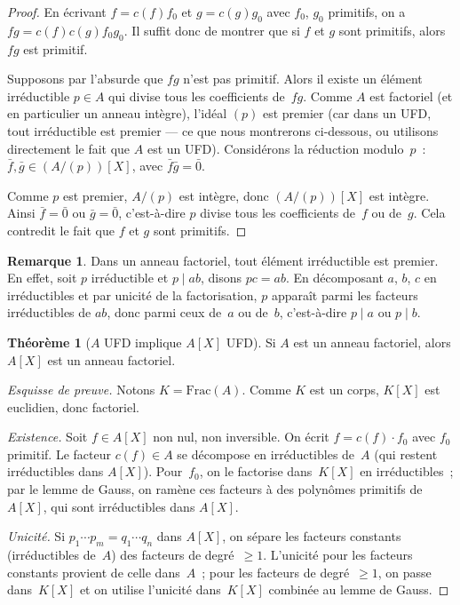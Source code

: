 \documentclass[12pt,a4paper,openany]{book}
\theoremstyle{definition}
\newtheorem{theoreme}{Théorème}[chapter]
\newtheorem{remarque}{Remarque}[chapter]
\begin{document}
\begin{proof}
En écrivant $f = c(f) f_0$ et $g = c(g) g_0$ avec $f_0$, $g_0$
primitifs, on a $fg = c(f)c(g) f_0 g_0$. Il suffit donc de montrer que
si $f$ et $g$ sont primitifs, alors $fg$ est primitif.

Supposons par l'absurde que $fg$ n'est pas primitif. Alors il existe un
élément irréductible $p \in A$ qui divise tous les coefficients de~$fg$.
Comme $A$ est factoriel (et en particulier un anneau intègre), l'idéal
$(p)$ est premier (car dans un UFD, tout irréductible est premier --- ce
que nous montrerons ci-dessous, ou utilisons directement le fait que $A$
est un UFD). Considérons la réduction modulo~$p$~:
$\bar{f}, \bar{g} \in (A/(p))[X]$, avec $\bar{f}\bar{g} = \bar{0}$.

Comme $p$ est premier, $A/(p)$ est intègre, donc $(A/(p))[X]$ est
intègre. Ainsi $\bar{f} = \bar{0}$ ou $\bar{g} = \bar{0}$,
c'est-à-dire $p$ divise tous les coefficients de~$f$ ou de~$g$. Cela
contredit le fait que $f$ et $g$ sont primitifs.
\end{proof}

\begin{remarque}\label{rem:irred-premier-UFD}
Dans un anneau factoriel, tout élément irréductible est premier. En
effet, soit $p$ irréductible et $p \mid ab$, disons $pc = ab$. En
décomposant $a$, $b$, $c$ en irréductibles et par unicité de la
factorisation, $p$ apparaît parmi les facteurs irréductibles de $ab$,
donc parmi ceux de~$a$ ou de~$b$, c'est-à-dire $p \mid a$ ou
$p \mid b$.
\end{remarque}

\begin{theoreme}[$A$ UFD implique {$A[X]$} UFD]\label{thm:AX-UFD}
Si $A$ est un anneau factoriel, alors $A[X]$ est un anneau factoriel.
\end{theoreme}

\begin{proof}[Esquisse de preuve]
Notons $K = \mathrm{Frac}(A)$. Comme $K$ est un corps, $K[X]$ est
euclidien, donc factoriel.

\emph{Existence.} Soit $f \in A[X]$ non nul, non inversible. On écrit
$f = c(f) \cdot f_0$ avec $f_0$ primitif. Le facteur $c(f) \in A$ se
décompose en irréductibles de~$A$ (qui restent irréductibles dans
$A[X]$). Pour~$f_0$, on le factorise dans~$K[X]$ en irréductibles~;
par le lemme de Gauss, on ramène ces facteurs à des polynômes primitifs
de~$A[X]$, qui sont irréductibles dans $A[X]$.

\emph{Unicité.} Si $p_1 \cdots p_m = q_1 \cdots q_n$ dans $A[X]$, on
sépare les facteurs constants (irréductibles de~$A$) des facteurs de
degré~$\geqslant 1$. L'unicité pour les facteurs constants provient de
celle dans~$A$~; pour les facteurs de degré~$\geqslant 1$, on passe
dans~$K[X]$ et on utilise l'unicité dans~$K[X]$ combinée au lemme de
Gauss.
\end{proof}
\end{document}
